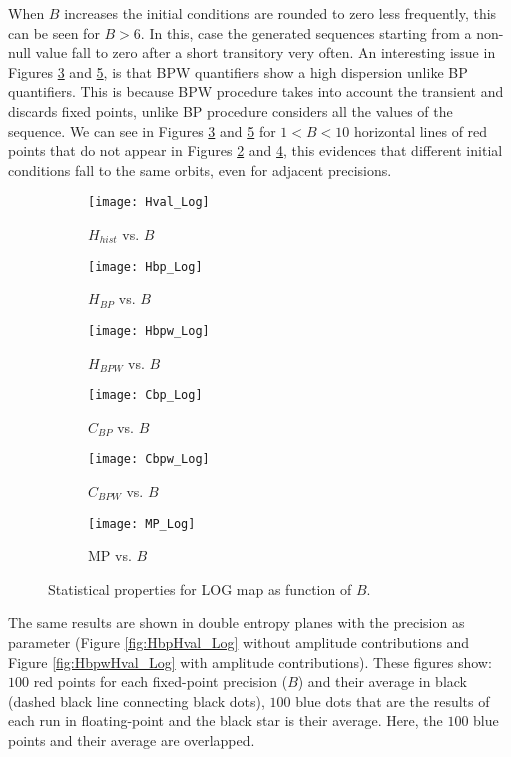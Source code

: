 When $B$ increases the initial conditions are rounded to zero less frequently, this can be seen for $B>6$.
In this, case the generated sequences starting from a non-null value fall to zero after a short transitory very often.
An interesting issue in Figures \ref{fig:Hbpw_Log} and \ref{fig:Cbpw_Log}, is that BPW quantifiers show a high dispersion unlike BP quantifiers.
This is because BPW procedure takes into account the transient and discards fixed points, unlike BP procedure considers all the values of the sequence.
We can see in Figures \ref{fig:Hbpw_Log} and \ref{fig:Cbpw_Log} for $1<B<10$ horizontal lines of red points that do not appear in Figures \ref{fig:Hbp_Log} and \ref{fig:Cbp_Log}, this evidences that different initial conditions fall to the same orbits, even for adjacent precisions.
%
\begin{figure}[H]
	\centering
	\begin{subfigure}[b]{0.49\textwidth}
		\texttt{[image: Hval\_Log]}
		\caption{$H_{hist}$ vs. $B$}
		\label{fig:Hval_Log}
	\end{subfigure}
	\begin{subfigure}[b]{0.49\textwidth}
		\texttt{[image: Hbp\_Log]}
		\caption{$H_{BP}$ vs. $B$}
		\label{fig:Hbp_Log}
	\end{subfigure}
	\begin{subfigure}[b]{0.49\textwidth}
		\texttt{[image: Hbpw\_Log]}
		\caption{$H_{BPW}$ vs. $B$}
		\label{fig:Hbpw_Log}
	\end{subfigure}
	\begin{subfigure}[b]{0.49\textwidth}
		\texttt{[image: Cbp\_Log]}
		\caption{$C_{BP}$ vs. $B$}
		\label{fig:Cbp_Log}
	\end{subfigure}
	\begin{subfigure}[b]{0.49\textwidth}
		\texttt{[image: Cbpw\_Log]}
		\caption{$C_{BPW}$ vs. $B$}
		\label{fig:Cbpw_Log}
	\end{subfigure}
	\begin{subfigure}[b]{0.49\textwidth}
		\texttt{[image: MP\_Log]}
		\caption{MP vs. $B$}
		\label{fig:MP_Log}
	\end{subfigure}
	\caption{Statistical properties for LOG map as function of $B$.}
	\label{fig:LOG_QuantiB}
\end{figure}

The same results are shown in double entropy planes with the precision as parameter (Figure \ref{fig:HbpHval_Log} without amplitude contributions and Figure \ref{fig:HbpwHval_Log} with amplitude contributions).
These figures show: $100$ red points for each fixed-point precision ($B$) and their average in black (dashed black line connecting black dots), $100$ blue dots that are the results of each run in floating-point and the black star is their average.
Here, the $100$ blue points and their average are overlapped.

